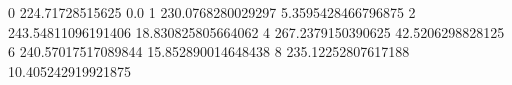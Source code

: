 0 224.71728515625 0.0
1 230.0768280029297 5.3595428466796875
2 243.54811096191406 18.830825805664062
4 267.2379150390625 42.5206298828125
6 240.57017517089844 15.852890014648438
8 235.12252807617188 10.405242919921875
